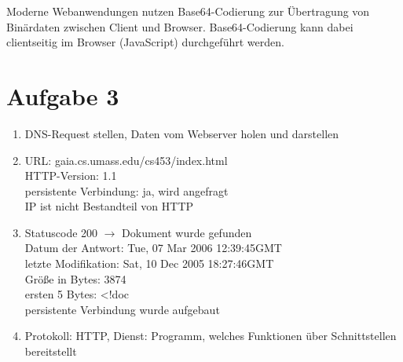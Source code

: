 \documentclass{article}
\begin{document}
	Moderne Webanwendungen nutzen Base64-Codierung zur Übertragung von Binärdaten zwischen Client und Browser. Base64-Codierung kann dabei clientseitig im Browser (JavaScript) durchgeführt werden.

	\section*{Aufgabe 3}
	\begin{enumerate}[label=(\alph*)]
		\item DNS-Request stellen, Daten vom Webserver holen und darstellen
		\item URL: gaia.cs.umass.edu/cs453/index.html \\
		HTTP-Version: 1.1 \\
		persistente Verbindung: ja, wird angefragt \\
		IP ist nicht Bestandteil von HTTP
		\item Statuscode 200 $\to$ Dokument wurde gefunden \\
		Datum der Antwort: Tue, 07 Mar 2006 12:39:45GMT \\
		letzte Modifikation: Sat, 10 Dec 2005 18:27:46GMT \\
		Größe in Bytes: 3874 \\
		ersten 5  Bytes: <!doc \\
		persistente Verbindung wurde aufgebaut
		\item Protokoll: HTTP, Dienst: Programm, welches Funktionen über Schnittstellen bereitstellt
	\end{enumerate}
\end{document}
